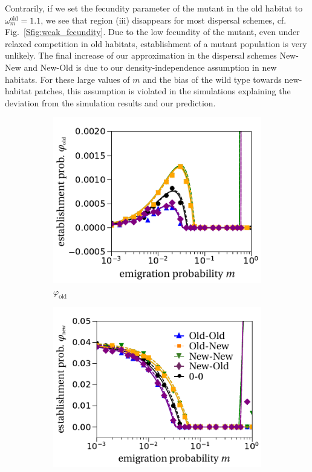 \documentclass[11pt]{article}
\newcommand{\chg}[1]{\textcolor{change}{#1}}
\begin{document}
\chg{Contrarily, if we set the fecundity parameter of the mutant in the old habitat to $\omega^\text{old}_m=1.1$, we see that region (iii) disappears for most dispersal schemes, cf. Fig.~\ref{Sfig:weak_fecundity}. Due to the low fecundity of the mutant, even under relaxed competition in old habitats, establishment of a mutant population is very unlikely. The final increase of our approximation in the dispersal schemes New-New and New-Old is due to our density-independence assumption in new habitats. For these large values of $m$ and the bias of the wild type towards new-habitat patches, this assumption is violated in the simulations explaining the deviation from the simulation results and our prediction. }

\begin{figure}
	\centering
	\begin{subfigure}{.5\textwidth}
		\centering
		\includegraphics[width=\linewidth]{figS2a.pdf}
		\caption{$\varphi_{\text{old}}$}
	\end{subfigure}%
	\begin{subfigure}{.5\textwidth}
		\centering
		\includegraphics[width=\linewidth]{figS2b.pdf}

\end{subfigure}
\end{figure}
\end{document}
